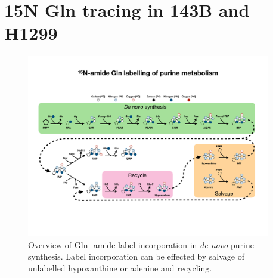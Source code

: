 \section{15N Gln tracing in 143B and H1299}
\begin{figure}[ht]
    \centering
    \includegraphics[width=0.95\textwidth]{figures/chap2/app/purine_tracing_overvew.pdf}
    \caption[Purine metabolism \hNi-amide Gln tracing overview.]{
    Overview of Gln \hNi-amide label incorporation in \textit{de novo} purine synthesis.
    Label incorporation can be effected by salvage of unlabelled hypoxanthine or adenine and recycling.
    }
    \label{fig:app_ch2:pur_tr_ov}
\end{figure}

